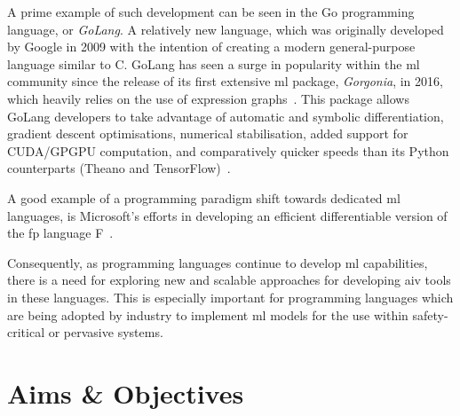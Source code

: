 
A prime example of such development can be seen in the Go programming language, or \textit{GoLang}. A relatively new language, which was originally developed by Google in 2009 with the intention
of creating a modern general-purpose language similar to C. 
GoLang has seen a surge in popularity within the \gls{ml} community since
the release of its first extensive \gls{ml} package, \textit{Gorgonia}, in 2016, which heavily relies on the use of expression graphs~\citep{chew2016}.
This package allows GoLang developers
to take advantage of automatic and symbolic differentiation, gradient descent optimisations, numerical stabilisation,
added support for CUDA/GPGPU computation, and comparatively quicker speeds than its Python counterparts (Theano and TensorFlow)~\citep{golang2020}.

A good example of a programming paradigm shift towards dedicated \gls{ml} languages, is Microsoft's efforts in developing
an efficient differentiable version of the \Gls{fp} language F~\citep{shaikhha2019}.

Consequently, as programming languages continue to develop \gls{ml} capabilities, there is a need for 
exploring new and scalable approaches for developing \gls{aiv} tools in these languages.
This is especially important for programming languages which are being adopted by industry to implement \gls{ml} models
for the use within safety-critical or pervasive systems.

\section{Aims \& Objectives}





